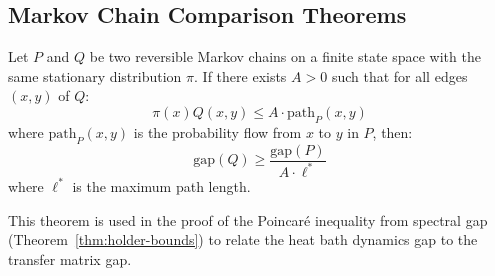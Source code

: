 \subsection{Markov Chain Comparison Theorems}

\begin{theorem}
Let $P$ and $Q$ be two reversible Markov chains on a finite state space with 
the same stationary distribution $\pi$. If there exists $A > 0$ such that 
for all edges $(x, y)$ of $Q$:
\[
\pi(x) Q(x,y) \leq A \cdot \text{path}_{P}(x, y)
\]
where $\text{path}_P(x,y)$ is the probability flow from $x$ to $y$ in $P$, then:
\[
\text{gap}(Q) \geq \frac{\text{gap}(P)}{A \cdot \ell^*}
\]
where $\ell^*$ is the maximum path length.
\end{theorem}

This theorem is used in the proof of the Poincaré inequality from spectral 
gap (Theorem~\ref{thm:holder-bounds}) to relate the heat bath dynamics gap 
to the transfer matrix gap.






